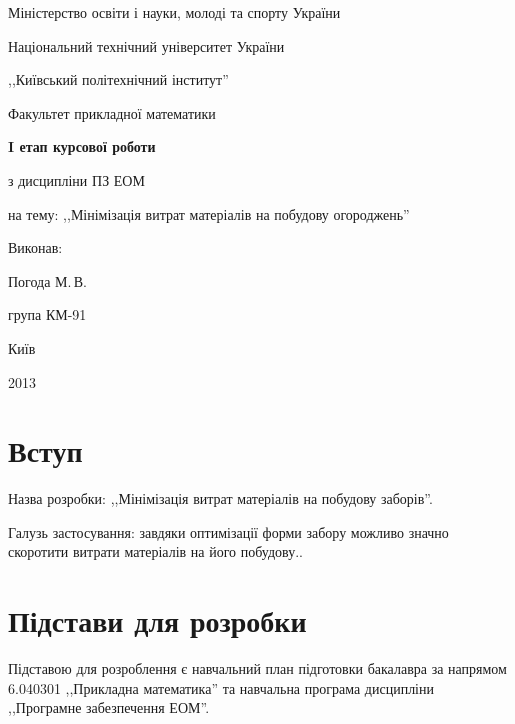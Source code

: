 \documentclass[a4paper,12pt,notitlepage,pdftex]{scrartcl}
\begin{document}
\begin{titlepage}
    \Large
    \begin{center}
        Міністерство освіти і науки, молоді та спорту України

        Національний технічний університет України

        ,,Київський політехнічний інститут''

        \vspace*{1cm}

        Факультет прикладної математики

        \vspace*{3.5cm}

        \textbf{I етап курсової роботи}

        з дисципліни ПЗ ЕОМ

        на тему: ,,Мінімізація витрат матеріалів на побудову огороджень''
    \end{center}

    \vspace*{4cm}

    Виконав:\hfill
        \begin{minipage}{0.3\textwidth}
            Погода М.\,В.

            група КМ-91
        \end{minipage}

    \vspace*{1cm}

    \begin{center}
        \Large
        Київ

        2013
    \end{center}
\end{titlepage}

\tableofcontents

\newpage

\section*{Вступ}

    Назва розробки: ,,Мінімізація витрат матеріалів на побудову заборів''.

    Галузь застосування: завдяки оптимізації форми забору можливо значно
    скоротити витрати матеріалів на його побудову..

\section{Підстави для розробки}
    Підставою для розроблення є навчальний план підготовки бакалавра за
    напрямом 6.040301 ,,Прикладна математика'' та навчальна програма
    дисципліни ,,Програмне забезпечення ЕОМ''.
\end{document}
